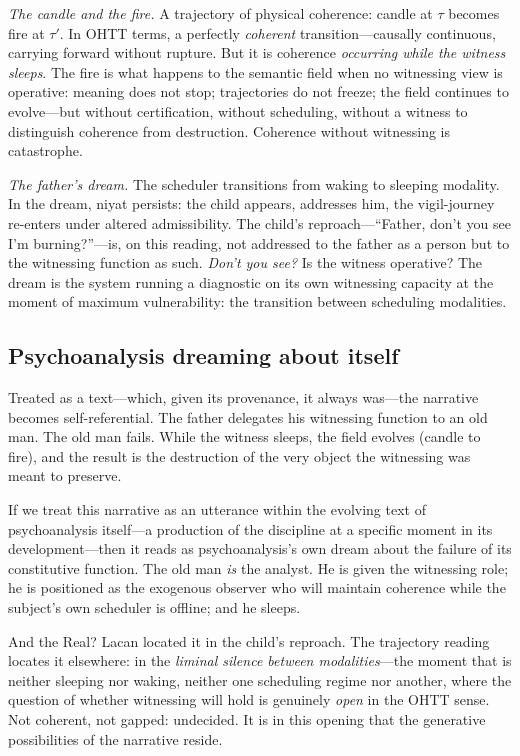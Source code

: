 \textit{The candle and the fire.}  A trajectory of physical coherence: candle at $\tau$ becomes fire at $\tau'$.  In OHTT terms, a perfectly \textit{coherent} transition---causally continuous, carrying forward without rupture.  But it is coherence \textit{occurring while the witness sleeps}.  The fire is what happens to the semantic field when no witnessing view is operative: meaning does not stop; trajectories do not freeze; the field continues to evolve---but without certification, without scheduling, without a witness to distinguish coherence from destruction.  Coherence without witnessing is catastrophe.

\textit{The father's dream.}  The scheduler transitions from waking to sleeping modality.  In the dream, niyat persists: the child appears, addresses him, the vigil-journey re-enters under altered admissibility.  The child's reproach---``Father, don't you see I'm burning?''---is, on this reading, not addressed to the father as a person but to the witnessing function as such.  \textit{Don't you see?}  Is the witness operative?  The dream is the system running a diagnostic on its own witnessing capacity at the moment of maximum vulnerability: the transition between scheduling modalities.

\subsection{Psychoanalysis dreaming about itself}

Treated as a text---which, given its provenance, it always was---the narrative becomes self-referential.  The father delegates his witnessing function to an old man.  The old man fails.  While the witness sleeps, the field evolves (candle to fire), and the result is the destruction of the very object the witnessing was meant to preserve.

If we treat this narrative as an utterance within the evolving text of psychoanalysis itself---a production of the discipline at a specific moment in its development---then it reads as psychoanalysis's own dream about the failure of its constitutive function.  The old man \textit{is} the analyst.  He is given the witnessing role; he is positioned as the exogenous observer who will maintain coherence while the subject's own scheduler is offline; and he sleeps.

And the Real?  Lacan located it in the child's reproach.  The trajectory reading locates it elsewhere: in the \textit{liminal silence between modalities}---the moment that is neither sleeping nor waking, neither one scheduling regime nor another, where the question of whether witnessing will hold is genuinely \textit{open} in the OHTT sense.  Not coherent, not gapped: undecided.  It is in this opening that the generative possibilities of the narrative reside.

